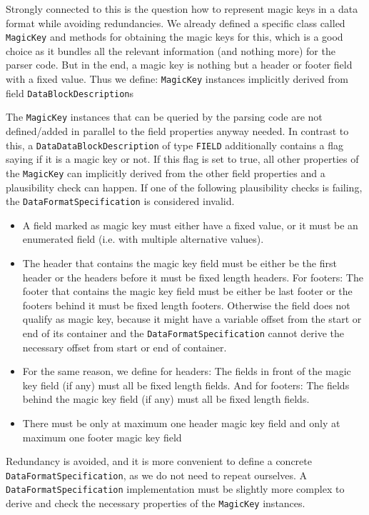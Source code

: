 Strongly connected to this is the question how to represent magic keys in a data format while avoiding redundancies. We already defined a specific class called \texttt{MagicKey} and methods for obtaining the magic keys for this, which is a good choice as it bundles all the relevant information (and nothing more) for the parser code. But in the end, a magic key is nothing but a header or footer field with a fixed value. Thus we define:
{%
\texttt{MagicKey} instances implicitly derived from field \texttt{DataBlockDescription}s 
}
{%
The \texttt{MagicKey} instances that can be queried by the parsing code are not defined/added in parallel to the field properties anyway needed. In contrast to this, a \texttt{DataDataBlockDescription} of type \texttt{FIELD} additionally contains a flag saying if it is a magic key or not. If this flag is set to true, all other properties of the \texttt{MagicKey} can implicitly derived from the other field properties and a plausibility check can happen. If one of the following plausibility checks is failing, the \texttt{DataFormatSpecification} is considered invalid. 
\begin{itemize}
\item A field marked as magic key must either have a fixed value, or it must be an enumerated field (i.e. with multiple alternative values).
\item The header that contains the magic key field must be either be the first header or the headers before it must be fixed length headers. For footers: The footer that contains the magic key field must be either be last footer or the footers behind it must be fixed length footers. Otherwise the field does not qualify as magic key, because it might have a variable offset from the start or end of its container and the \texttt{DataFormatSpecification} cannot derive the necessary offset from start or end of container.
\item For the same reason, we define for headers: The fields in front of the magic key field (if any) must all be fixed length fields. And for footers: The fields behind the magic key field (if any) must all be fixed length fields.
\item There must be only at maximum one header magic key field and only at maximum one footer magic key field
\end{itemize}
}
{%
Redundancy is avoided, and it is more convenient to define a concrete \texttt{DataFormatSpecification}, as we do not need to repeat ourselves.
}
{%
A \texttt{DataFormatSpecification} implementation must be slightly more complex to derive and check the necessary properties of the \texttt{MagicKey} instances.
}

